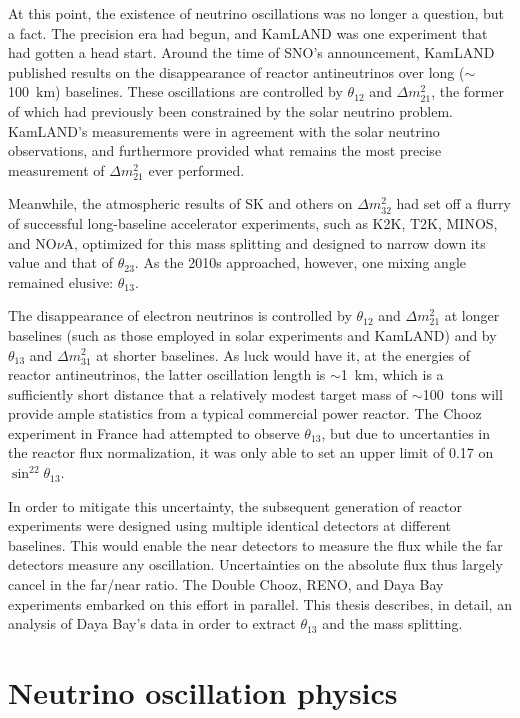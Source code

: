\documentclass[../thesis.tex]{subfiles}
\begin{document}
At this point, the existence of neutrino oscillations was no longer a question, but a fact. The precision era had begun, and KamLAND was one experiment that had gotten a head start. Around the time of SNO's announcement, KamLAND published results on the disappearance of reactor antineutrinos over long ($\sim$100~km) baselines. These oscillations are controlled by $\theta_{12}$ and \(\Delta m^2_{21}\), the former of which had previously been constrained by the solar neutrino problem. KamLAND's measurements were in agreement with the solar neutrino observations, and furthermore provided what remains the most precise measurement of \(\Delta m^2_{21}\) ever performed.

Meanwhile, the atmospheric results of SK and others on \(\Delta m^2_{32}\) had set off a flurry of successful long-baseline accelerator experiments, such as K2K, T2K, MINOS, and NO$\nu$A, optimized for this mass splitting and designed to narrow down its value and that of $\theta_{23}$. As the 2010s approached, however, one mixing angle remained elusive: $\theta_{13}$.

The disappearance of electron neutrinos is controlled by $\theta_{12}$ and \(\Delta m^2_{21}\) at longer baselines (such as those employed in solar experiments and KamLAND) and by $\theta_{13}$ and \(\Delta m^2_{31}\) at shorter baselines. As luck would have it, at the energies of reactor antineutrinos, the latter oscillation length is $\sim$1~km, which is a sufficiently short distance that a relatively modest target mass of $\sim$100~tons will provide ample statistics from a typical commercial power reactor. The Chooz experiment in France had attempted to observe $\theta_{13}$, but due to uncertanties in the reactor flux normalization, it was only able to set an upper limit of 0.17 on \(\sin^22\theta_{13}\).

In order to mitigate this uncertainty, the subsequent generation of reactor experiments were designed using multiple identical detectors at different baselines. This would enable the near detectors to measure the flux while the far detectors measure any oscillation. Uncertainties on the absolute flux thus largely cancel in the far/near ratio. The Double Chooz, RENO, and Daya Bay experiments embarked on this effort in parallel. This thesis describes, in detail, an analysis of Daya Bay's data in order to extract $\theta_{13}$ and the mass splitting.

\section{Neutrino oscillation physics}
\label{sec:oscPhysics}
\end{document}
